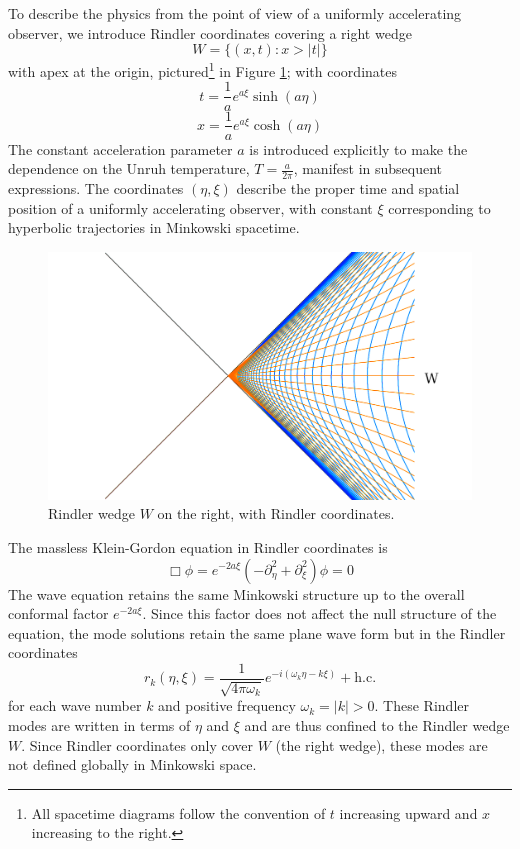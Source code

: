 \documentclass[12pt,a4paper]{article}
\begin{document}
To describe the physics from the point of view of a uniformly accelerating observer, we introduce Rindler coordinates \cite{frodden2018unruh,rindler1966kruskal} covering a right wedge 
\begin{equation}
  W = \{(x,t) : x>|t|\}
\end{equation}
with apex at the origin, pictured\footnote{All spacetime diagrams follow the convention of $t$ increasing upward and $x$ increasing to the right.} in Figure \ref{rindlerw}; with coordinates
\begin{equation}
  t = \frac{1}{a}e^{a\xi}\sinh{(a\eta)}
\label{sinh}
\end{equation}
\begin{equation}
x = \frac{1}{a}e^{a\xi}\cosh{(a\eta)}
\end{equation}
The constant acceleration parameter $a$ is introduced explicitly to make the dependence on the Unruh temperature, $T = \frac{a}{2\pi}$, manifest in subsequent expressions. The coordinates $(\eta, \xi)$ describe the proper time and spatial position of a uniformly accelerating observer, with constant $\xi$ corresponding to hyperbolic trajectories in Minkowski spacetime.


\begin{figure}[h]
\centering
\includegraphics[scale=0.2]{rindler_w.png}
\caption{Rindler wedge $W$ on the right, with Rindler coordinates.}
\label{rindlerw}
\end{figure}

The massless Klein-Gordon equation in Rindler coordinates is
\begin{equation}
  \Box \phi = e^{-2a \xi}(-\partial_\eta^2 + \partial_\xi^2) \phi = 0
\end{equation}
The wave equation retains the same Minkowski structure up to the overall conformal factor $e^{-2a\xi}$. Since this factor does not affect the null structure of the equation, the mode solutions retain the same plane wave form but in the Rindler coordinates
\begin{equation}
 r_k(\eta,\xi) = \frac{1}{\sqrt{4 \pi \omega_k}} e^{-i(\omega_k \eta -k \xi)} + \text{h.c.}
\end{equation}
for each wave number $k$ and positive frequency $\omega_k = |k| > 0$.  These Rindler modes are written in terms of $\eta$ and $\xi$ and are thus confined to the Rindler wedge $W$.  Since Rindler coordinates only cover $W$ (the right wedge), these modes are not defined globally in Minkowski space.
\end{document}
